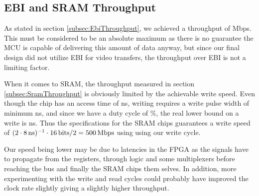 \subsection{EBI and SRAM Throughput}
As stated in section \ref{subsec:EbiThroughput}, we achieved a throughput of \unit[384]{Mbps}.
This must be considered to be an absolute maximum as there is no guarantee the MCU is capable of delivering this amount of data anyway, but since our final design did not utilize EBI for video transfers, the throughput over EBI is not a limiting factor.

When it comes to SRAM, the throughput measured in section \ref{subsec:SramThroughput} is obviously limited by the achievable write speed.
Even though the chip has an access time of \unit[10]{ns}, writing requires a write pulse width of minimum \unit[8]{ns}, and since we have a duty cycle of \unit[50]{\%}, the real lower bound on a write is \unit[16]{ns}.
Thus the specifications for the SRAM chips guarantees a write speed of $(2\cdot\unit[8]{ns})^{-1} \cdot \unit[16]{bits} / 2 = \unit[500]{Mbps}$ using using our write cycle.

Our speed being lower may be due to latencies in the FPGA as the signals have to propagate from the registers, through logic and some multiplexers before reaching the bus and finally the SRAM chips them selves. In addition, more experimenting with the write and read cycles could probably have improved the clock rate slightly giving a slightly higher throughput.

